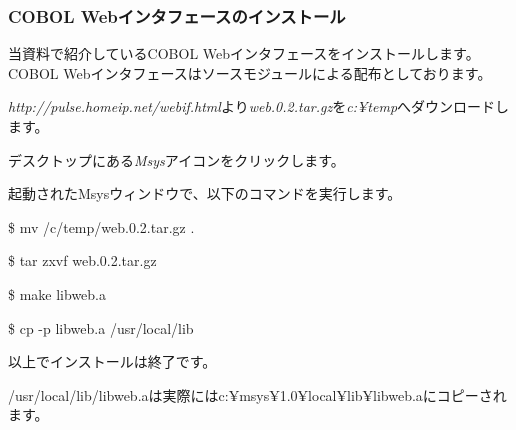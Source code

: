 \subsubsection{COBOL Webインタフェースのインストール}

当資料で紹介しているCOBOL Webインタフェースをインストールします。
COBOL Webインタフェースはソースモジュールによる配布としております。

{\it http://pulse.homeip.net/webif.html}より{\it web.0.2.tar.gz}を{\it c:¥temp}へダウンロードします。

デスクトップにある{\it Msys}アイコンをクリックします。

起動されたMsysウィンドウで、以下のコマンドを実行します。

\$ mv /c/temp/web.0.2.tar.gz .

\$ tar zxvf web.0.2.tar.gz

\$ make libweb.a

\$ cp -p libweb.a /usr/local/lib

以上でインストールは終了です。

/usr/local/lib/libweb.aは実際にはc:¥msys¥1.0¥local¥lib¥libweb.aにコピーされます。






